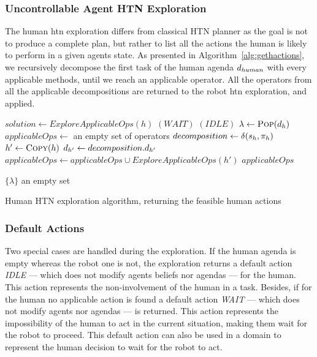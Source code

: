 \documentclass[a4paper,11pt,twoside]{StyleThese}
\begin{document}
\subsubsection{Uncontrollable Agent HTN Exploration}
The human \acrshort{htn} exploration differs from classical HTN planner as the goal is not to produce a complete plan, but rather to list all the actions the human is likely to perform in a given agents state. As presented in Algorithm~\ref{alg:gethactions}, we recursively decompose the first task of the human agenda $d_{human}$ with every applicable methods, until we reach an applicable operator. All the operators from all the applicable decompositions are returned to the robot \acrshort{htn} exploration, and applied.

\begin{algorithm}[htb!]
\begin{algorithmic}[1]
\State $solution \leftarrow ExploreApplicableOps(h)$
	\Return $(WAIT)$
\EndIf
\EndFunction
\Statex
{}
	\Return $(IDLE)$
\EndIf
\State $\lambda \leftarrow \textsc{Pop}(d_h)$
	\State $applicableOps \leftarrow$ an empty set of operators
		\State $decomposition \leftarrow \delta(s_h, \pi_h)$
			\State $h' \leftarrow \textsc{Copy}(h)$
			\State $d_{h'} \leftarrow decomposition.d_{h'}$
			\State $applicableOps \leftarrow applicableOps \cup ExploreApplicableOps(h')$
		\EndIf
	\EndFor
	\State \Return $applicableOps$
\EndIf

		\State \Return $\{\lambda\}$
	\Else
		\State \Return an empty set
	\EndIf
\EndIf
\EndFunction
	
\end{algorithmic}
 \caption{Human HTN exploration algorithm, returning the feasible human actions}
 \label{alg:gethactions}
\end{algorithm}

\subsubsection{Default Actions} Two special cases are handled during the exploration. If the human agenda is empty whereas the robot one is not, the exploration returns a default action \textit{IDLE} --- which does not modify agents beliefs nor agendas --- for the human. This action represents the non-involvement of the human in a task. Besides, if for the human no applicable action is found a default action \textit{WAIT} --- which does not modify agents nor agendas --- is returned. This action represents the impossibility of the human to act in the current situation, making them wait for the robot to proceed. This default action can also be used in a domain to represent the human decision to wait for the robot to act.
\end{document}
